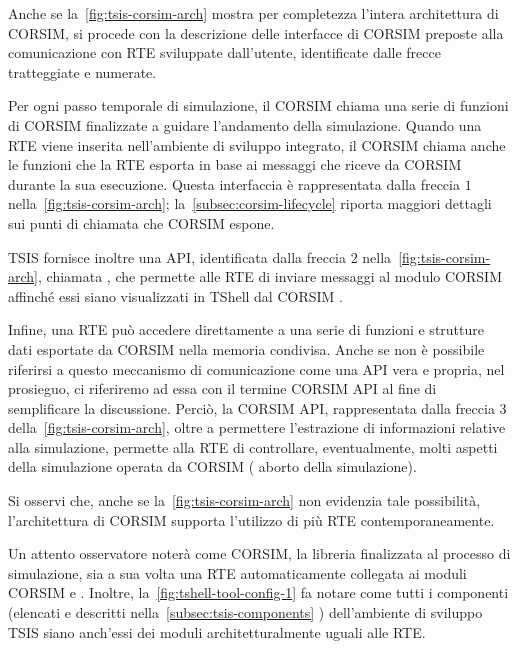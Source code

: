 Anche se la~\vref{fig:tsis-corsim-arch} mostra per completezza l'intera architettura di \acs{CORSIM}, si procede con la descrizione delle interfacce di \acs{CORSIM} preposte alla comunicazione con \acs{RTE} sviluppate dall'utente, identificate dalle frecce tratteggiate e numerate.

Per ogni passo temporale di simulazione, il \acs{CORSIM}  chiama una serie di funzioni di \acs{CORSIM} finalizzate a guidare l'andamento della simulazione. Quando una \acs{RTE} viene inserita nell'ambiente di sviluppo integrato, il \acs{CORSIM}  chiama anche le funzioni che la \acs{RTE} esporta in base ai messaggi che riceve da \acs{CORSIM} durante la sua esecuzione. Questa interfaccia è rappresentata dalla freccia $1$ nella~\vref{fig:tsis-corsim-arch}; la~\autoref{subsec:corsim-lifecycle}  riporta maggiori dettagli sui punti di chiamata che \acs{CORSIM} espone.

\acs{TSIS} fornisce inoltre una \acs{API}, identificata dalla freccia $2$ nella~\vref{fig:tsis-corsim-arch}, chiamata , che permette alle \acs{RTE} di inviare messaggi al modulo \acs{CORSIM}  affinché essi siano visualizzati in \acs{TShell} dal \acs{CORSIM} .

Infine, una \acs{RTE} può accedere direttamente a una serie di funzioni e strutture dati esportate da \acs{CORSIM} nella memoria condivisa. Anche se non è possibile riferirsi a questo meccanismo di comunicazione come una \acs{API} vera e propria, nel prosieguo, ci riferiremo ad essa con il termine \acs{CORSIM} \acs{API} al fine di semplificare la discussione. Perciò, la \acs{CORSIM} \acs{API}, rappresentata dalla freccia $3$ della~\vref{fig:tsis-corsim-arch}, oltre a permettere l'estrazione di informazioni relative alla simulazione, permette alla \acs{RTE} di controllare, eventualmente, molti aspetti della simulazione operata da \acs{CORSIM} (\eg{} aborto della simulazione).

Si osservi che, anche se la~\vref{fig:tsis-corsim-arch} non evidenzia tale possibilità, l'architettura di \acs{CORSIM} supporta l'utilizzo di più \acs{RTE} contemporaneamente.

\begin{nota}
Un attento osservatore noterà come \acs{CORSIM}, la libreria finalizzata al processo di simulazione, sia a sua volta una \acs{RTE} automaticamente collegata ai moduli \acs{CORSIM}  e . Inoltre, la~\vref{fig:tshell-tool-config-1} fa notare come tutti i componenti (elencati e descritti nella~\autoref{subsec:tsis-components} ) dell'ambiente di sviluppo \acs{TSIS} siano anch'essi dei moduli architetturalmente uguali alle \acs{RTE}.
\end{nota}

